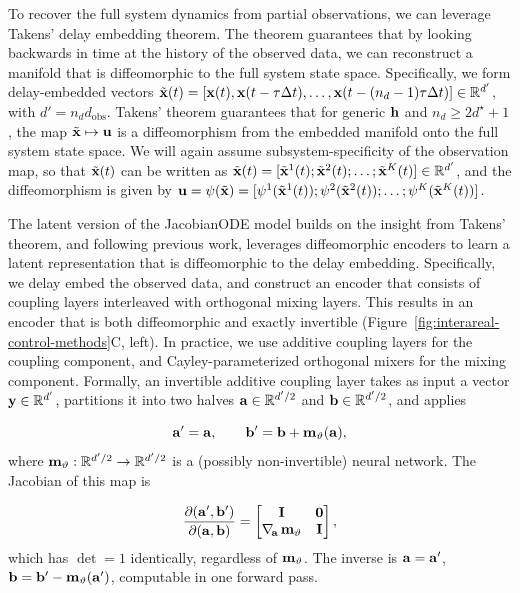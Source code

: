  To recover the full system dynamics from partial observations, we can leverage Takens' delay embedding theorem. The theorem guarantees that by looking backwards in time at the history of the observed data, we can reconstruct a manifold that is diffeomorphic to the full system state space. Specifically, we form delay-embedded vectors $\tilde{\vb{x}}(t) = [\vb{x}(t), \vb{x}(t-\tau\Delta t), \ldots, \vb{x}(t-(n_d-1)\tau\Delta t)] \in \mathbb{R}^{d'}$, with $d' = n_d d_{\mathrm{obs}}$. Takens' theorem guarantees that for generic $\vb{h}$ and $n_d \geq 2d^{\star} + 1$, the map $\tilde{\vb{x}} \mapsto \vb{u}$ is a diffeomorphism from the embedded manifold onto the full system state space. We will again assume subsystem-specificity of the observation map, so that $\tilde{\vb{x}}(t)$ can be written as $\tilde{\vb{x}}(t) = [\tilde{\vb{x}}^1(t); \tilde{\vb{x}}^2(t); \ldots; \tilde{\vb{x}}^K(t)] \in \mathbb{R}^{d'}$, and the diffeomorphism is given by $\vb{u} = \vb{\psi}(\tilde{\vb{x}}) = [\vb{\psi}^1(\tilde{\vb{x}}^1(t)); \vb{\psi}^2(\tilde{\vb{x}}^2(t)); \ldots; \vb{\psi}^K(\tilde{\vb{x}}^K(t))]$.

 The latent version of the JacobianODE model builds on the insight from Takens' theorem, and following previous work,\cite{Versteeg2023-ld} leverages diffeomorphic encoders to learn a latent representation that is diffeomorphic to the delay embedding. Specifically, we delay embed the observed data, and construct an encoder that consists of coupling layers interleaved with orthogonal mixing layers. This results in an encoder that is both diffeomorphic and exactly invertible (Figure~\ref{fig:interareal-control-methods}C, left). In practice, we use additive coupling layers for the coupling component, and Cayley-parameterized orthogonal mixers for the mixing component.\cite{Dinh2014-lx,Lezcano-Casado2019-su,Trockman2021-iw} Formally, an invertible additive coupling layer takes as input a vector $\vb{y} \in \mathbb{R}^{d'}$, partitions it into two halves $\vb{a} \in \mathbb{R}^{d'/2}$ and $\vb{b} \in \mathbb{R}^{d'/2}$, and applies

\begin{equation}
\vb{a}' = \vb{a}, \qquad \vb{b}' = \vb{b} + \vb{m}_\vartheta(\vb{a}),
\end{equation}
where $\vb{m}_\vartheta:\mathbb{R}^{d'/2} \to \mathbb{R}^{d'/2}$ is a (possibly non-invertible) neural network. The Jacobian of this map is

\begin{equation}
\frac{\partial(\vb{a}',\vb{b}')}{\partial(\vb{a},\vb{b})} = \begin{bmatrix} \mathbf{I} & \mathbf{0} \\ \nabla_{\!\vb{a}}\,\vb{m}_\vartheta & \mathbf{I} \end{bmatrix},
\end{equation}
which has $\det = 1$ identically, regardless of $\vb{m}_\vartheta$. The inverse is $\vb{a} = \vb{a}'$, $\vb{b} = \vb{b}' - \vb{m}_\vartheta(\vb{a}')$, computable in one forward pass.


